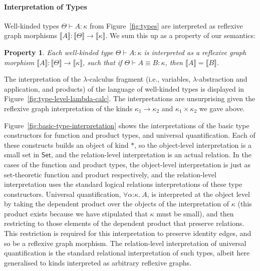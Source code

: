 \documentclass[preprint]{sigplanconf}
\newtheorem{property}{Property}
\theoremstyle{examplestyle}
\newcommand{\sem}[1]{\llbracket #1 \rrbracket}
\newcommand{\Set}{\mathsf{Set}}
\begin{document}
\paragraph{Interpretation of Types} Well-kinded types $\Theta \vdash A
: \kappa$ from Figure~\ref{fig:types} are interpreted as reflexive
graph morphisms $\sem{A} : \sem{\Theta} \to \sem{\kappa}$. We sum this
up as a property of our semantics:
\begin{property}\label{property:semantic-types}
  Each well-kinded type $\Theta \vdash A : \kappa$ is interpreted as a
  reflexive graph morphism $\sem{A} : \sem{\Theta} \to \sem{\kappa}$,
  such that if $\Theta \vdash A \equiv B : \kappa$, then $\sem{A} =
  \sem{B}$.
\end{property}
%
%
The interpretation of the $\lambda$-calculus fragment (i.e.,
variables, $\lambda$-abstraction and application, and products) of the
language of well-kinded types is displayed in
Figure~\ref{fig:type-level-lambda-calc}. The interpretations are
unsurprising given the reflexive graph interpretation of the kinds
$\kappa_1 \to \kappa_2$ and $\kappa_1 \times \kappa_2$ we gave above.

Figure~\ref{fig:basic-type-interpretation} shows the interpretations
of the basic type constructors for function and product types, and
universal quantification. Each of these constructs builds an object of
kind $*$, so the object-level interpretation is a small set in $\Set$,
and the relation-level interpretation is an actual relation. In the
cases of the function and product types, the object-level
interpretation is just as set-theoretic function and product
respectively, and the relation-level interpretation uses the standard
logical relations interpretations of these type
constructors. Universal quantification, $\forall
\alpha\mathord:\kappa.~A$, is interpreted at the object level by
taking the dependent product over the objects of the interpretation of
$\kappa$ (this product exists because we have stipulated that $\kappa$
must be small), and then restricting to those elements of the
dependent product that preserve relations. This restriction is
required for this interpretation to preserve identity edges, and so be
a reflexive graph morphism. The relation-level interpretation of
universal quantification is the standard relational interpretation of
such types, albeit here generalised to kinds interpreted as arbitrary
reflexive graphs.
\end{document}
